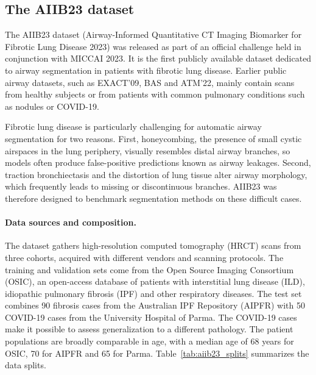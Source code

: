 
\subsection{The AIIB23 dataset}  %
\label{sec:aiib23}  %

The AIIB23 dataset (Airway-Informed Quantitative CT Imaging Biomarker for
Fibrotic Lung Disease 2023) was released as part of an official challenge held
in conjunction with MICCAI 2023\cite{nan2024aiib23}. It is the first publicly available dataset dedicated to
airway segmentation in patients with fibrotic lung disease. Earlier public
airway datasets, such as EXACT'09, BAS and ATM'22, mainly contain scans from
healthy subjects or from patients with common pulmonary conditions such as
nodules or COVID-19.

Fibrotic lung disease is particularly challenging for automatic airway
segmentation for two reasons. First, honeycombing, the presence of small
cystic airspaces in the lung periphery, visually resembles distal airway
branches, so models often produce false-positive predictions known as airway
leakages. Second, traction bronchiectasis and the distortion of lung tissue
alter airway morphology, which frequently leads to missing or discontinuous
branches. AIIB23 was therefore designed to benchmark segmentation methods on
these difficult cases.

\paragraph{Data sources and composition.}  %
The dataset gathers high-resolution computed tomography (HRCT) scans from
three cohorts, acquired with different vendors and scanning protocols. The
training and validation sets come from the Open Source Imaging Consortium
(OSIC), an open-access database of patients with interstitial lung disease
(ILD), idiopathic pulmonary fibrosis (IPF) and other respiratory diseases.
The test set combines 90 fibrosis cases from the Australian IPF Repository
(AIPFR) with 50 COVID-19 cases from the University Hospital of Parma. The
COVID-19 cases make it possible to assess generalization to a different
pathology. The patient populations are broadly comparable in age, with a
median age of 68 years for OSIC, 70 for AIPFR and 65 for Parma.
Table~\ref{tab:aiib23_splits} summarizes the data splits.  %

